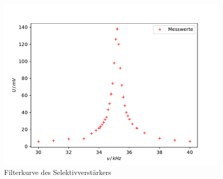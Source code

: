 \begin{figure}
  \centering
  \includegraphics[scale=0.7]{filter.pdf}
  \caption{Filterkurve des Selektivverstärkers}
  \label{fig:filter}
\end{figure}
\newpage
